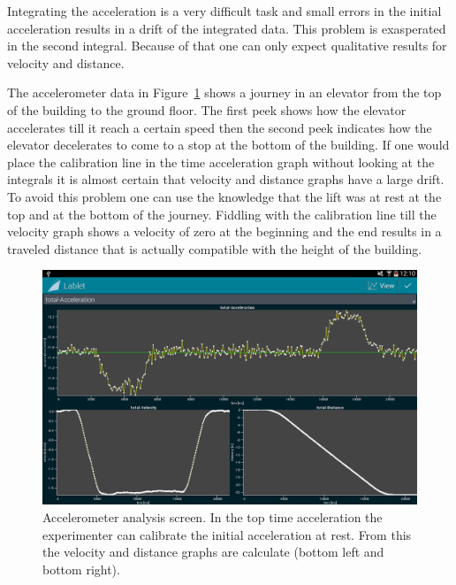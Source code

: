 \documentclass{sigchi}
\begin{document}
Integrating the acceleration is a very difficult task and small errors
in the initial acceleration results in a drift of the integrated data.
This problem is exasperated in the second integral.  Because of that
one can only expect qualitative results for velocity and distance.

The accelerometer data in Figure~\ref{fig:AccelerometerAnalysis} shows
a journey in an elevator from the top of the building to the ground
floor.  The first peek shows how the elevator accelerates till it
reach a certain speed then the second peek indicates how the elevator
decelerates to come to a stop at the bottom of the building.  If one
would place the calibration line in the time acceleration graph
without looking at the integrals it is almost certain that velocity
and distance graphs have a large drift.  To avoid this problem one can
use the knowledge that the lift was at rest at the top and at the
bottom of the journey.  Fiddling with the calibration line till the
velocity graph shows a velocity of zero at the beginning and the end
results in a traveled distance that is actually compatible with the
height of the building.

\begin{figure}
  \centering
  \includegraphics[width=.99\columnwidth]{AccelerometerAnalysis}
  \caption{Accelerometer analysis screen.  In the top time
    acceleration the experimenter can calibrate the initial
    acceleration at rest.  From this the velocity and distance graphs
    are calculate (bottom left and bottom
    right).\label{fig:AccelerometerAnalysis} }
\end{figure}
\end{document}
